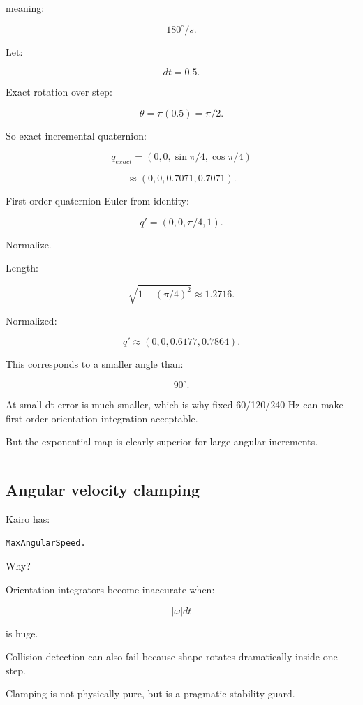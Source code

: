 meaning:

\[
180^\circ/s.
\]

Let:

\[
dt=0.5.
\]

Exact rotation over step:

\[
\theta
=
\pi(0.5)
=
\pi/2.
\]

So exact incremental quaternion:

\[
q_{exact}
=
(0,0,\sin\pi/4,\cos\pi/4)
\]

\[
\approx
(0,0,0.7071,0.7071).
\]

First-order quaternion Euler from identity:

\[
q'
=
(0,0,\pi/4,1).
\]

Normalize.

Length:

\[
\sqrt{
1+
(\pi/4)^2
}
\approx1.2716.
\]

Normalized:

\[
q'
\approx
(0,0,0.6177,0.7864).
\]

This corresponds to a smaller angle than:

\[
90^\circ.
\]

At small dt error is much smaller, which is why fixed 60/120/240 Hz can make first-order orientation integration acceptable.

But the exponential map is clearly superior for large angular increments.

\begin{center}\rule{0.5\linewidth}{0.5pt}\end{center}

\subsection{Angular velocity clamping}\label{06-engine-ii-ch038-angular-velocity-clamping}

Kairo has:

\begin{verbatim}
MaxAngularSpeed.
\end{verbatim}

Why?

Orientation integrators become inaccurate when:

\[
|\omega|dt
\]

is huge.

Collision detection can also fail because shape rotates dramatically inside one step.

Clamping is not physically pure, but is a pragmatic stability guard.

